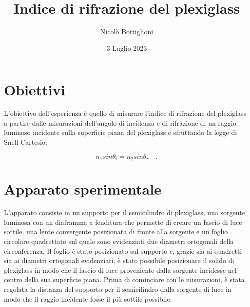 \documentclass{article}
\begin{document}
	\author{Nicolò Bottiglioni}
	\title{Indice di rifrazione del plexiglass}
	\date{3 Luglio 2023}
	\maketitle
	
	\section{Obiettivi}
	L'obiettivo dell'esperienza è quello di misurare l'indice di rifrazione del plexiglass a partire dalle misurazioni dell'angolo di incidenza e di rifrazione di un raggio luminoso incidente sulla superficie piana del plexiglass e sfruttando la legge di Snell-Cartesio:
	
	\begin{equation}
		 n_1sin\theta_i = n_2sin\theta_r \quad.
	\end{equation}
	 
	\section{Apparato sperimentale}
	L'apparato consiste in  un supporto per il semicilindro di plexiglass, una sorgente luminosa con un diaframma a fenditura che permette di creare un fascio di luce sottile, una lente convergente posizionata di fronte alla sorgente e un foglio circolare quadrettato sul quale sono evidenziati due diametri ortogonali della circonferenza.
	Il foglio è stato posizionato sul supporto e, grazie sia ai quadretti sia ai diametri ortogonali evidenziati, è stato possibile posizionare il solido di plexiglass in modo che il fascio di luce proveniente dalla sorgente incidesse nel centro della sua superficie piana. Prima di cominciare con le misurazioni, è stata regolata la distanza del supporto per il semicilindro dalla sorgente di luce in modo che il raggio incidente fosse il più sottile possibile.
	
\end{document}
